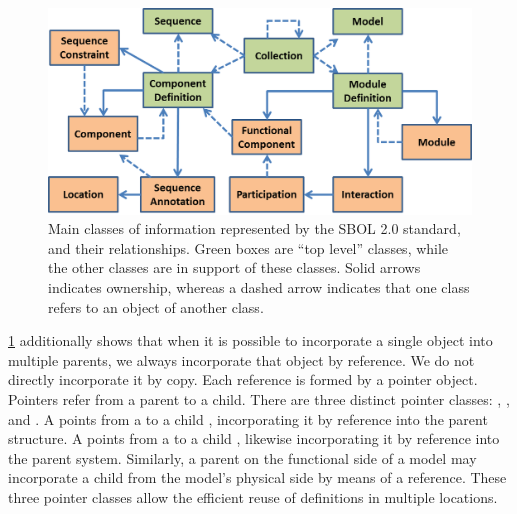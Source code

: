 \begin{figure}[ht]
\begin{center}
\includegraphics[scale=0.85]{images/OverviewFig2-v4.png}
\caption{Main classes of information represented by the SBOL 2.0 standard, and their relationships.  Green boxes are ``top level'' classes, while the other classes are in support of these classes. Solid arrows indicates ownership, whereas a dashed arrow indicates that one class refers to an object of another class.}
\label{images:overview2}
\end{center}
\end{figure}

\ref{images:overview2} additionally shows that when it is possible to incorporate a single object into multiple parents, we always incorporate that object by reference. We do not directly incorporate it by copy. Each reference is formed by a pointer object. Pointers refer from a parent to a child. There are three distinct pointer classes: , , and . A  points from a  to a child , incorporating it by reference into the parent structure. A  points from a  to a child , likewise incorporating it by reference into the parent system. Similarly, a parent  on the functional side of a model may incorporate a child  from the model's physical side by means of a  reference. These three pointer classes allow the efficient reuse of definitions in multiple locations.

